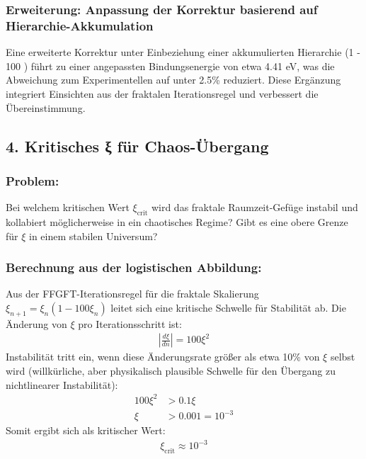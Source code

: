 \documentclass[12pt,a4paper]{article}
\begin{document}
	\subsubsection*{Erweiterung: Anpassung der Korrektur basierend auf Hierarchie-Akkumulation}
	Eine erweiterte Korrektur unter Einbeziehung einer akkumulierten Hierarchie (1 - 100 \xi {}) führt zu einer angepassten Bindungsenergie von etwa 4.41 eV, was die Abweichung zum Experimentellen auf unter 2.5\% reduziert. Diese Ergänzung integriert Einsichten aus der fraktalen Iterationsregel und verbessert die Übereinstimmung.
	
	\subsection*{4. Kritisches ξ für Chaos-Übergang}
	
	\subsubsection*{Problem:}
	Bei welchem kritischen Wert $\xi_{\text{crit}}$ wird das fraktale Raumzeit-Gefüge instabil und kollabiert möglicherweise in ein chaotisches Regime? Gibt es eine obere Grenze für $\xi$ in einem stabilen Universum?
	
	\subsubsection*{Berechnung aus der logistischen Abbildung:}
	
	Aus der FFGFT-Iterationsregel für die fraktale Skalierung $\xi_{n+1} = \xi_n (1 - 100\xi_n)$ leitet sich eine kritische Schwelle für Stabilität ab. Die Änderung von $\xi$ pro Iterationsschritt ist:
	\begin{align*}
		\left|\frac{d\xi}{dn}\right| = 100\xi^2
	\end{align*}
	Instabilität tritt ein, wenn diese Änderungsrate größer als etwa 10\% von $\xi$ selbst wird (willkürliche, aber physikalisch plausible Schwelle für den Übergang zu nichtlinearer Instabilität):
	\begin{align*}
		100\xi^2 &> 0.1\xi \\
		\xi &> 0.001 = 10^{-3}
	\end{align*}
	Somit ergibt sich als kritischer Wert:
	\begin{align*}
		\boxed{\xi_{\text{crit}} \approx 10^{-3}}
	\end{align*}
	
\end{document}

